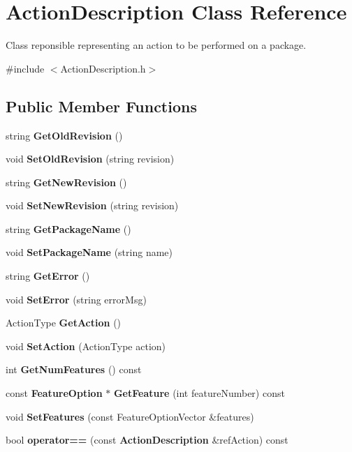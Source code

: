 \section{ActionDescription Class Reference}
\label{classActionDescription}


Class reponsible representing an action to be performed on a package.  




{\ttfamily \#include $<$ActionDescription.h$>$}

\subsection*{Public Member Functions}
\begin{DoxyCompactItemize}
\item 
string {\bf GetOldRevision} ()
\item 
void {\bf SetOldRevision} (string revision)
\item 
string {\bf GetNewRevision} ()
\item 
void {\bf SetNewRevision} (string revision)
\item 
string {\bf GetPackageName} ()
\item 
void {\bf SetPackageName} (string name)
\item 
string {\bf GetError} ()
\item 
void {\bf SetError} (string errorMsg)
\item 
ActionType {\bf GetAction} ()
\item 
void {\bf SetAction} (ActionType action)
\item 
int {\bf GetNumFeatures} () const 
\item 
const {\bf FeatureOption} $\ast$ {\bf GetFeature} (int featureNumber) const 
\item 
void {\bf SetFeatures} (const FeatureOptionVector \&features)
\item 
bool {\bf operator==} (const {\bf ActionDescription} \&refAction) const 
\end{DoxyCompactItemize}
